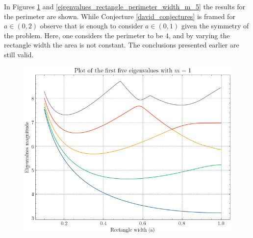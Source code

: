 In Figures \ref{eigenvalues_rectangle_perimeter_width_m_1} and \ref{eigenvalues_rectangle_perimeter_width_m_5} the results for the perimeter are shown. While Conjecture \ref{david_conjectures} is framed for \(a \in (0, 2)\) observe that is enough to consider \(a \in (0, 1)\) given the symmetry of the problem. Here, one considers the perimeter to be 4, and by varying the rectangle width the area is not constant. The conclusions presented earlier are still valid.

\begin{figure}[!htb]
    \centering
    \begin{minipage}{.5\textwidth}
      \centering
      \includegraphics[width=\linewidth]{Images/Dirac/quad/eigenvalues_rectangle_perimeter_width_m_1.png}
      \captionsetup{width=0.9\linewidth} %
      \label{eigenvalues_rectangle_perimeter_width_m_1}
    \end{minipage}%
    \begin{minipage}{.5\textwidth}
      \centering

\end{minipage}
\end{figure}
